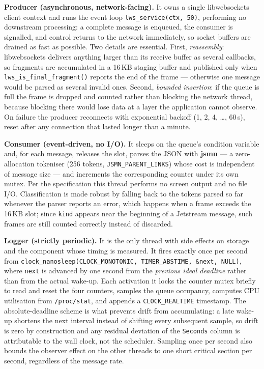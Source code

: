 \documentclass[11pt,a4paper]{article}
\newcommand{\code}[1]{\texttt{\small #1}}
\begin{document}
\textbf{Producer (asynchronous, network-facing).} It owns a single libwebsockets
client context and runs the event loop \code{lws\_service(ctx, 50)}, performing
no downstream processing: a complete message is enqueued, the consumer is
signalled, and control returns to the network immediately, so socket buffers are
drained as fast as possible. Two details are essential. First,
\emph{reassembly}: libwebsockets delivers anything larger than its receive buffer
as several callbacks, so fragments are accumulated in a 16\,KB staging buffer and
published only when \code{lws\_is\_final\_fragment()} reports the end of the
frame --- otherwise one message would be parsed as several invalid ones. Second,
\emph{bounded insertion}: if the queue is full the frame is dropped and counted
rather than blocking the network thread, because blocking there would lose data
at a layer the application cannot observe. On failure the producer reconnects
with exponential backoff (1, 2, 4, \dots, 60\,s), reset after any connection that
lasted longer than a minute.

\textbf{Consumer (event-driven, no I/O).} It sleeps on the queue's condition
variable and, for each message, releases the slot, parses the JSON with
\textbf{jsmn} --- a zero-allocation tokeniser (256 tokens, \code{JSMN\_PARENT\_LINKS})
whose cost is independent of message size --- and increments the corresponding
counter under its own mutex. Per the specification this thread performs no screen
output and no file I/O. Classification is made robust by falling back to the
tokens parsed so far whenever the parser reports an error, which happens when a
frame exceeds the 16\,KB slot; since \code{kind} appears near the beginning of a
Jetstream message, such frames are still counted correctly instead of discarded.

\textbf{Logger (strictly periodic).} It is the only thread with side effects on
storage and the component whose timing is measured. It fires exactly once per
second from \code{clock\_nanosleep(CLOCK\_MONOTONIC, TIMER\_ABSTIME, \&next, NULL)},
where \code{next} is advanced by one second from the \emph{previous ideal
deadline} rather than from the actual wake-up. Each activation it locks the
counter mutex briefly to read and reset the four counters, samples the queue
occupancy, computes CPU utilisation from \code{/proc/stat}, and appends a
\code{CLOCK\_REALTIME} timestamp. The absolute-deadline scheme is what prevents
drift from accumulating: a late wake-up shortens the next interval instead of
shifting every subsequent sample, so drift is zero by construction and any
residual deviation of the \code{Seconds} column is attributable to the wall
clock, not the scheduler. Sampling once per second also bounds the observer
effect on the other threads to one short critical section per second, regardless
of the message rate.
\end{document}

